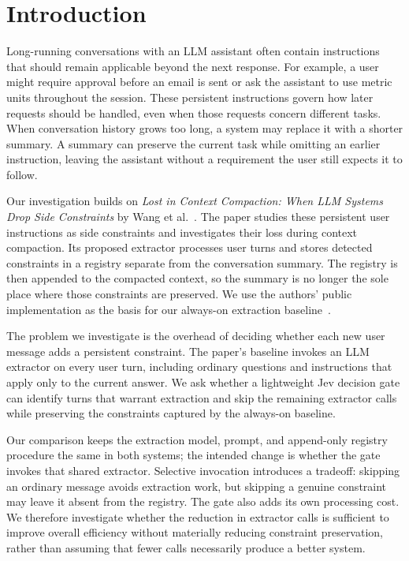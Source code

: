 \section{Introduction}
\label{sec:intro}

Long-running conversations with an LLM assistant often contain instructions
that should remain applicable beyond the next response. For example, a user
might require approval before an email is sent or ask the assistant to use
metric units throughout the session. These persistent instructions govern how
later requests should be handled, even when those requests concern different
tasks. When conversation history grows too long, a system may replace it with
a shorter summary. A summary can preserve the current task while omitting an
earlier instruction, leaving the assistant without a requirement the user still
expects it to follow.

Our investigation builds on \emph{Lost in Context Compaction: When LLM Systems
Drop Side Constraints} by Wang et al.~\cite{wang2026compaction}. The paper
studies these persistent user instructions as side constraints and investigates
their loss during context compaction. Its proposed extractor processes user
turns and stores detected constraints in a registry separate from the
conversation summary. The registry is then appended to the compacted context,
so the summary is no longer the sole place where those constraints are
preserved. We use the authors' public implementation as the basis for our
always-on extraction baseline~\cite{compactionintegrity}.

The problem we investigate is the overhead of deciding whether each new user
message adds a persistent constraint. The paper's baseline invokes an LLM
extractor on every user turn, including ordinary questions and instructions
that apply only to the current answer. We ask whether a lightweight Jev
decision gate can identify turns that warrant extraction and skip the
remaining extractor calls while preserving the constraints captured by the
always-on baseline.

Our comparison keeps the extraction model, prompt, and append-only registry
procedure the same in both systems; the intended change is whether the gate
invokes that shared extractor. Selective invocation introduces a tradeoff:
skipping an ordinary message avoids extraction work, but skipping a genuine
constraint may leave it absent from the registry. The gate also adds its own
processing cost. We therefore investigate whether the reduction in extractor
calls is sufficient to improve overall efficiency without materially reducing
constraint preservation, rather than assuming that fewer calls necessarily
produce a better system.
